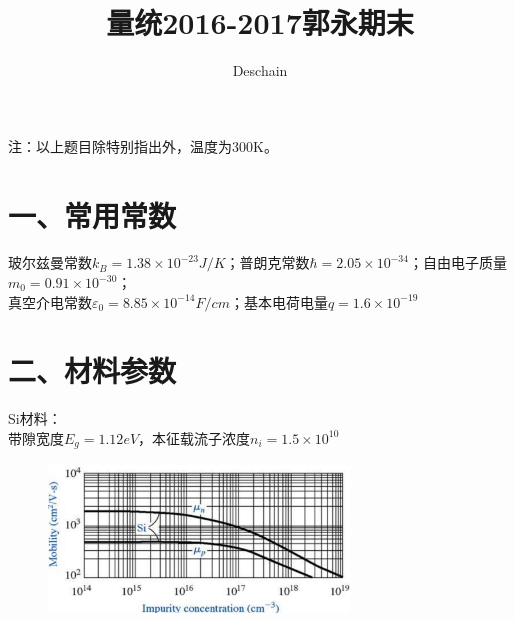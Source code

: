 \documentclass[UTF8]{ctexart}
\title{量统2016-2017郭永期末}
\author{Deschain}
\begin{document}
\maketitle
注：以上题目除特别指出外，温度为300K。
\section{一、常用常数}
玻尔兹曼常数$k_B=1.38\times10^{-23}J/K$；普朗克常数$\hbar=2.05\times10^{-34}$；自由电子质量$m_0=0.91\times10^{-30}$；\\
真空介电常数$\varepsilon_0=8.85\times10^{-14}F/cm$；基本电荷电量$q=1.6\times10^{-19}$\\
\section*{二、材料参数}
Si材料：\\
带隙宽度$E_g=1.12eV$，本征载流子浓度$n_i=1.5\times10^{10}$\\
\begin{figure}[H]
    \centering
    \includegraphics[width=8cm,height=4cm]{Si.png}
 \end{figure}
\end{document}
